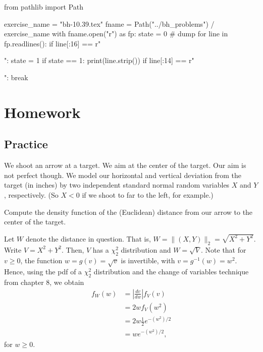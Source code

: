 \begin{pycode}
from pathlib import Path

exercise_name = "bh-10.39.tex"
fname = Path("../bh_problems") / exercise_name
with fname.open("r") as fp:
    state = 0  # dump
    for line in fp.readlines():
        if line[:16] == r"\begin{exercise}":
            state = 1
        if state == 1:
            print(line.strip())
        if line[:14] == r"\end{exercise}":
            break
\end{pycode}

\section{Homework}
\label{sec:homework}

\subsection{Practice}
\label{sec:practice}

We shoot an arrow at a target. We aim at the center of the target. Our aim is not perfect though. We model our horizontal and vertical deviation from the target (in inches) by two independent standard normal random variables $X$ and $Y$, respectively. (So $X<0$ if we shoot to far to the left, for example.)

\begin{exercise}
Compute the density function of the (Euclidean) distance from our arrow to the center of the target. %
\begin{solution}
Let $W$ denote the distance in question. That is, $W = \| (X,Y) \|_2 = \sqrt{X^2 + Y^2}$. Write $V = X^2 + Y^2$. Then, $V$ has a $\chi^2_2$ distribution and $W = \sqrt{V}$. Note that for $v \geq 0$, the function $w = g(v) = \sqrt{v}$ is invertible, with $v = g^{-1}(w) = w^2$. Hence, using the pdf of a $\chi^2_2$ distribution and the change of variables technique from chapter 8, we obtain
\begin{align}
    f_W(w) &=  |\frac{dv}{dw}| f_V(v) \\
    &= 2w f_V(w^2) \\
    &= 2w \frac{1}{2} e^{-(w^2)/2} \\
    &= w e^{-(w^2)/2},
\end{align}
for $w \geq 0$.
\end{solution}
\end{exercise}


